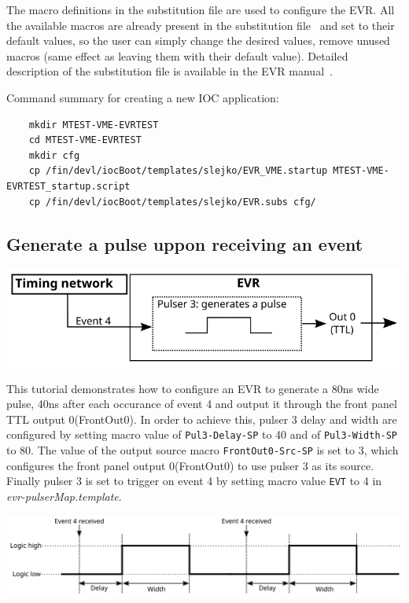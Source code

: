 \documentclass[12pt,a4paper]{article}
\begin{document}
The macro definitions in the substitution file are used to configure the EVR. All the available macros are already present in the substitution file~\cite{substitution_git} and set to their default values, so the user can simply change the desired values, remove unused macros (same effect as leaving them with their default value). Detailed description of the substitution file is available in the EVR manual~\cite{evr_manual}.

Command summary for creating a new IOC application:
\begin{lstlisting}
	mkdir MTEST-VME-EVRTEST
	cd MTEST-VME-EVRTEST
	mkdir cfg
	cp /fin/devl/iocBoot/templates/slejko/EVR_VME.startup MTEST-VME-EVRTEST_startup.script
	cp /fin/devl/iocBoot/templates/slejko/EVR.subs cfg/
\end{lstlisting}

\subsection{Generate a pulse uppon receiving an event}
	\includegraphics[]{./img/pulser}
	
This tutorial demonstrates how to configure an EVR to generate a 80ns wide pulse, 40ns after each occurance of event 4 and output it through the front panel TTL output 0(FrontOut0). In order to achieve this, pulser 3 delay and width are configured by setting macro value of \texttt{Pul3-Delay-SP} to 40 and of \texttt{Pul3-Width-SP} to 80. The value of the output source macro \texttt{FrontOut0-Src-SP} is set to 3, which configures the front panel output 0(FrontOut0) to use pulser 3 as its source. Finally pulser 3 is set to trigger on event 4 by setting macro value \texttt{EVT} to 4 in \textit{evr-pulserMap.template}. 

	\includegraphics[width=\columnwidth]{./img/pulserSignal}
\end{document}
